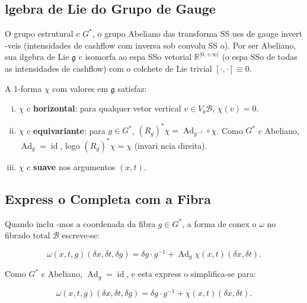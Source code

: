 {\subsection{ lgebra de Lie do Grupo de Gauge}

O grupo estrutural c $G^*$, o grupo Abeliano das transforma SS ues de
gauge invert -veis (intensidades de cashflow com inversa sob
convolu SS o). Por ser Abeliano, sua ilgebra de Lie $\mathfrak{g}$ c
isomorfa ao espa SSo vetorial $\mathbb{R}^{[0,+\infty[}$ (o espa SSo de
todas as intensidades de cashflow) com o colchete de Lie trivial
$[\cdot, \cdot] \equiv 0$.

\begin{prop}\label{prop:chi_properties}
A 1-forma $\chi$ com valores em $\mathfrak{g}$ satisfaz:
\begin{enumerate}[(i)]
 \item $\chi$ c \textbf{horizontal}: para qualquer vetor vertical
 $v \in V_b\mathcal{B}$, $\chi(v) = 0$.
 \item $\chi$ c \textbf{equivariante}: para $g \in G^*$,
 $(R_g)^*\chi = \operatorname{Ad}_{g^{-1}} \circ \chi$.
 Como $G^*$ c Abeliano, $\operatorname{Ad}_g = \operatorname{id}$,
 logo $(R_g)^*\chi = \chi$ (invari ncia direita).
 \item $\chi$ c \textbf{suave} nos argumentos $(x,t)$.
\end{enumerate}
\end{prop}

\subsection{Express o Completa com a Fibra}

Quando inclu -mos a coordenada da fibra $g \in G^*$, a forma de conex o
$\omega$ no fibrado total $\mathcal{B}$ escreve-se:

\begin{equation}\label{eq:connection_form_full}
 \omega(x,t,g)(\delta x, \delta t, \delta g)
 = \delta g \cdot g^{-1} + \operatorname{Ad}_g \chi(x,t)(\delta x, \delta t).
\end{equation}

Como $G^*$ c Abeliano, $\operatorname{Ad}_g = \operatorname{id}$, e
esta express o simplifica-se para:

\begin{equation}\label{eq:connection_form_simple}
 \omega(x,t,g)(\delta x, \delta t, \delta g)
 = \delta g \cdot g^{-1} + \chi(x,t)(\delta x, \delta t).
\end{equation}

}
